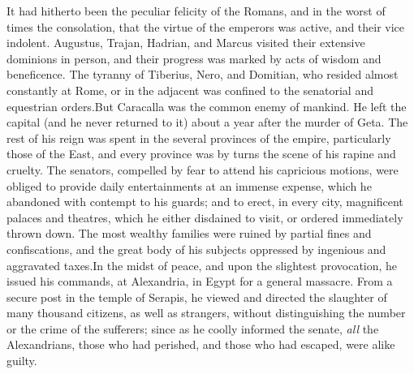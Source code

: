 It had hitherto been the peculiar felicity of the Romans, and in
the worst of times the consolation, that the virtue of the
emperors was active, and their vice indolent. Augustus, Trajan,
Hadrian, and Marcus visited their extensive dominions in person,
and their progress was marked by acts of wisdom and beneficence.
The tyranny of Tiberius, Nero, and Domitian, who resided almost
constantly at Rome, or in the adjacent was confined to the
senatorial and equestrian orders.\footnotemark[33] But Caracalla was the common
enemy of mankind. He left the capital (and he never returned to
it) about a year after the murder of Geta. The rest of his reign
was spent in the several provinces of the empire, particularly
those of the East, and every province was by turns the scene of
his rapine and cruelty. The senators, compelled by fear to attend
his capricious motions, were obliged to provide daily
entertainments at an immense expense, which he abandoned with
contempt to his guards; and to erect, in every city, magnificent
palaces and theatres, which he either disdained to visit, or
ordered immediately thrown down. The most wealthy families were
ruined by partial fines and confiscations, and the great body of
his subjects oppressed by ingenious and aggravated taxes.\footnotemark[34] In
the midst of peace, and upon the slightest provocation, he issued
his commands, at Alexandria, in Egypt for a general massacre.
From a secure post in the temple of Serapis, he viewed and
directed the slaughter of many thousand citizens, as well as
strangers, without distinguishing the number or the crime of the
sufferers; since as he coolly informed the senate, \textit{all} the
Alexandrians, those who had perished, and those who had escaped,
were alike guilty.\footnotemark[35]




